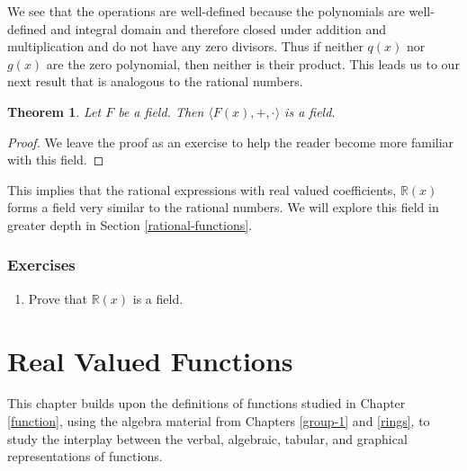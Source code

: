 \documentclass[
]{book}
\providecommand{\tightlist}{%
  \setlength{\itemsep}{0pt}\setlength{\parskip}{0pt}}
\newtheorem{theorem}{Theorem}[chapter]
\theoremstyle{definition}
\theoremstyle{definition}
\theoremstyle{definition}
\theoremstyle{definition}
\theoremstyle{remark}
\begin{document}
We see that the operations are well-defined because the polynomials are well-defined and integral domain and therefore closed under addition and multiplication and do not have any zero divisors. Thus if neither \(q(x)\) nor \(g(x)\) are the zero polynomial, then neither is their product. This leads us to our next result that is analogous to the rational numbers.

\begin{theorem}
Let \(F\) be a field. Then \(\langle F(x),+,\cdot \rangle\) is a field.
\end{theorem}

\begin{proof}
We leave the proof as an exercise to help the reader become more familiar with this field.
\end{proof}

This implies that the rational expressions with real valued coefficients, \(\mathbb{R}(x)\) forms a field very similar to the rational numbers. We will explore this field in greater depth in Section \ref{rational-functions}.

\hypertarget{exercises-26}{%
\subsection{Exercises}\label{exercises-26}}

\begin{enumerate}
\def\labelenumi{\arabic{enumi}.}
\tightlist
\item
  Prove that \(\mathbb{R}(x)\) is a field.
\end{enumerate}

\hypertarget{real-valued-functions}{%
\chapter{Real Valued Functions}\label{real-valued-functions}}

This chapter builds upon the definitions of functions studied in Chapter \ref{function}, using the algebra material from Chapters \ref{group-1} and \ref{rings}, to study the interplay between the verbal, algebraic, tabular, and graphical representations of functions.
\end{document}
